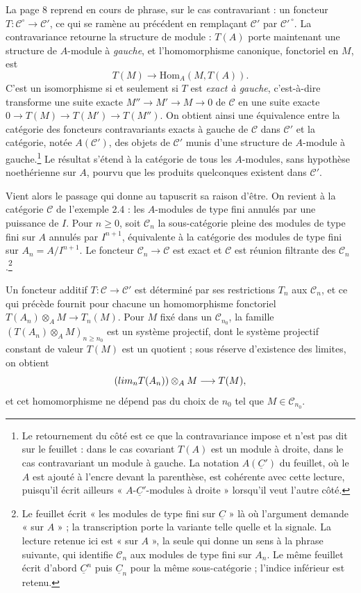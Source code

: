 \documentclass[11pt,a4paper]{article}
\begin{document}
La page 8 reprend en cours de phrase, sur le cas contravariant : un foncteur
$T : \mathcal{C}^{\circ} \to \mathcal{C}'$, ce qui se ramène au précédent en
remplaçant $\mathcal{C}'$ par $\mathcal{C}'^{\,\circ}$. La contravariance
retourne la structure de module : $T(A)$ porte maintenant une structure de
$A$-module à \emph{gauche}, et l'homomorphisme canonique, fonctoriel en $M$, est
\[
  T(M) \longrightarrow \mathrm{Hom}_{A}(M, T(A)) .
\]
C'est un isomorphisme si et seulement si $T$ est \emph{exact à gauche},
c'est-à-dire transforme une suite exacte $M'' \to M' \to M \to 0$ de
$\mathcal{C}$ en une suite exacte $0 \to T(M) \to T(M') \to T(M'')$. On obtient
ainsi une équivalence entre la catégorie des foncteurs contravariants exacts à
gauche de $\mathcal{C}$ dans $\mathcal{C}'$ et la catégorie, notée $A(\mathcal{C}')$,
des objets de $\mathcal{C}'$ munis d'une structure de $A$-module à
gauche.\footnote{Le retournement du côté est ce que la contravariance impose et
n'est pas dit sur le feuillet : dans le cas covariant $T(A)$ est un module à
droite, dans le cas contravariant un module à gauche. La notation
$A(\underline{C}')$ du feuillet, où le $A$ est ajouté à l'encre devant la
parenthèse, est cohérente avec cette lecture, puisqu'il écrit ailleurs
« $A$-$\underline{C}'$-modules à droite » lorsqu'il veut l'autre côté.} Le
résultat s'étend à la catégorie de tous les $A$-modules, sans hypothèse
noethérienne sur $A$, pourvu que les produits quelconques existent dans
$\mathcal{C}'$.

Vient alors le passage qui donne au tapuscrit sa raison d'être. On revient à la
catégorie $\mathcal{C}$ de l'exemple 2.4 : les $A$-modules de type fini annulés
par une puissance de $I$. Pour $n \geqslant 0$, soit $\mathcal{C}_{n}$ la
sous-catégorie pleine des modules de type fini sur $A$ annulés par $I^{n+1}$,
équivalente à la catégorie des modules de type fini sur $A_{n} = A/I^{n+1}$. Le
foncteur $\mathcal{C}_{n} \to \mathcal{C}$ est exact et $\mathcal{C}$ est
réunion filtrante des $\mathcal{C}_{n}$.\footnote{Le feuillet écrit « les modules
de type fini sur $\underline{C}$ » là où l'argument demande « sur $A$ » ; la
transcription porte la variante telle quelle et la signale. La lecture retenue
ici est « sur $A$ », la seule qui donne un sens à la phrase suivante, qui
identifie $\mathcal{C}_{n}$ aux modules de type fini sur $A_{n}$. Le même
feuillet écrit d'abord $\underline{C}^{n}$ puis $\underline{C}_{n}$ pour la même
sous-catégorie ; l'indice inférieur est retenu.}

Un foncteur additif $T : \mathcal{C} \to \mathcal{C}'$ est déterminé par ses
restrictions $T_{n}$ aux $\mathcal{C}_{n}$, et ce qui précède fournit pour
chacune un homomorphisme fonctoriel $T(A_{n}) \otimes_{A} M \to T_{n}(M)$. Pour
$M$ fixé dans un $\mathcal{C}_{n_{0}}$, la famille $(T(A_{n}) \otimes_{A} M)_{n
\geqslant n_{0}}$ est un système projectif, dont le système projectif constant
de valeur $T(M)$ est un quotient ; sous réserve d'existence des limites, on
obtient
\[
  \left(\varprojlim_{n} T(A_{n})\right) \otimes_{A} M \longrightarrow T(M) ,
\]
et cet homomorphisme ne dépend pas du choix de $n_{0}$ tel que
$M \in \mathcal{C}_{n_{0}}$.
\end{document}
